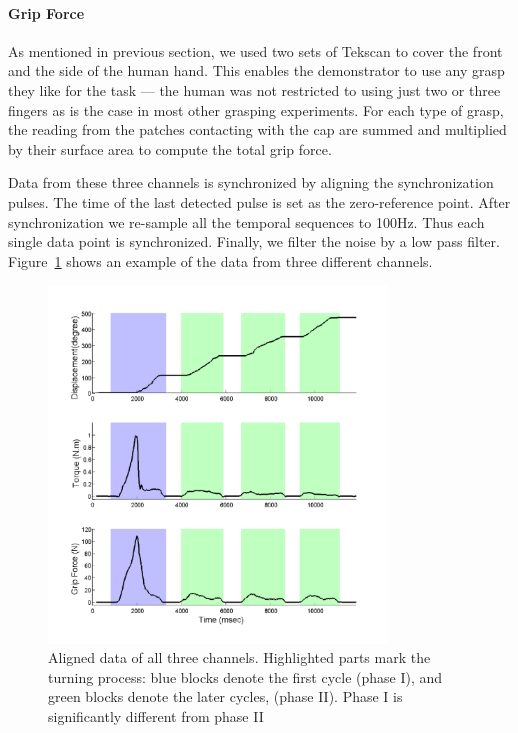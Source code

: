 \paragraph{\textbf{Grip Force}}
\label{tekscan}
As mentioned in previous section, we used two sets of Tekscan to cover
the front and the side of the human hand. This enables the
demonstrator to use any grasp they like for the task --- the human was
not restricted to using just two or three fingers as is the case in
most other grasping experiments. For each type of grasp, the reading
from the patches contacting with the cap are summed and multiplied by
their surface area to compute the total grip force. %


Data from these three channels is synchronized by aligning the
synchronization pulses. The time of the last detected pulse is set as
the zero-reference point. After synchronization we re-sample all the
temporal sequences to 100Hz. Thus each single data point is
synchronized. Finally, we filter the noise by a low pass
filter. Figure~\ref{fig:3channels} shows an example of the data from
three different channels.



\begin{figure}
  \centering
  \hspace{-0.5cm}
  \includegraphics[width=9cm]{./fig/b3c2_1_sTF.pdf}
  \vspace{-0.5cm}
  \caption{ \scriptsize{Aligned data of all three
      channels. Highlighted parts mark the turning process: blue
      blocks denote the first cycle (phase I), and green
      blocks denote the later cycles, (phase II). Phase I is
      significantly different from phase II}
}
\label{fig:3channels}
\end{figure}

